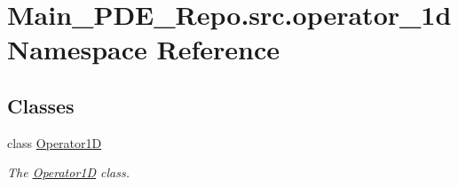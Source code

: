\hypertarget{namespaceMain__PDE__Repo_1_1src_1_1operator__1d}{}\section{Main\+\_\+\+P\+D\+E\+\_\+\+Repo.\+src.\+operator\+\_\+1d Namespace Reference}
\label{namespaceMain__PDE__Repo_1_1src_1_1operator__1d}
\subsection*{Classes}
\begin{DoxyCompactItemize}
\item 
class \hyperlink{classMain__PDE__Repo_1_1src_1_1operator__1d_1_1Operator1D}{Operator1D}
\begin{DoxyCompactList}\small\item\em The \hyperlink{classMain__PDE__Repo_1_1src_1_1operator__1d_1_1Operator1D}{Operator1D} class. \end{DoxyCompactList}\end{DoxyCompactItemize}
